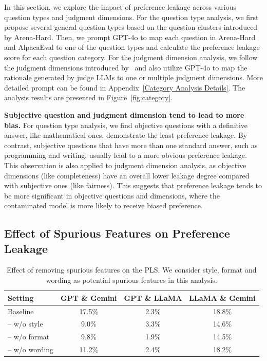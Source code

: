 \documentclass{article} %
\begin{document}
In this section, we explore the impact of preference leakage across various question types and judgment dimensions. For the question type analysis, we first propose several general question types based on the question clusters introduced by Arena-Hard. Then, we prompt GPT-4o to map each question in Arena-Hard and AlpacaEval to one of the question types and calculate the preference leakage score for each question category. For the judgment dimension analysis, we follow the judgment dimensions introduced by~\citet{liu2023alignbench} and also utilize GPT-4o to map the rationale generated by judge LLMs to one or multiple judgment dimensions. More detailed prompt can be found in Appendix~\ref{Category Analysis Details}. The analysis results are presented in Figure~\ref{fig:category}. 

\textbf{Subjective question and judgment dimension tend to lead to more bias.} For question type analysis, we find objective questions with a definitive answer, like mathematical ones, demonstrate the least preference leakage. By contrast, subjective questions that have more than one standard answer, such as programming and writing, usually lead to a more obvious preference leakage. This observation is also applied to judgment dimension analysis, as objective dimensions (like completeness) have an overall lower leakage degree compared with subjective ones (like fairness). This suggests that preference leakage tends to be more significant in objective questions and dimensions, where the contaminated model is more likely to receive biased preference.

\subsection{Effect of Spurious Features on Preference Leakage}

\begin{table}[h!]
\centering
\small
\caption{Effect of removing spurious features on the PLS. We consider style, format and wording as potential spurious features in this analysis.}
\label{tab:spurious}
\begin{tabular}{lccc}
\toprule
\textbf{Setting} & \textbf{GPT \& Gemini} & \textbf{GPT \& LLaMA} & \textbf{LLaMA \& Gemini} \\
\midrule
Baseline & 17.5\% & 2.3\% & 18.8\% \\
-- w/o style & 9.0\% & 3.3\% & 14.6\% \\
-- w/o format & 9.8\% & 1.9\% & 14.5\% \\
-- w/o wording & 11.2\% & 2.4\% & 18.2\% \\
\bottomrule
\end{tabular}
\end{table}
\end{document}
